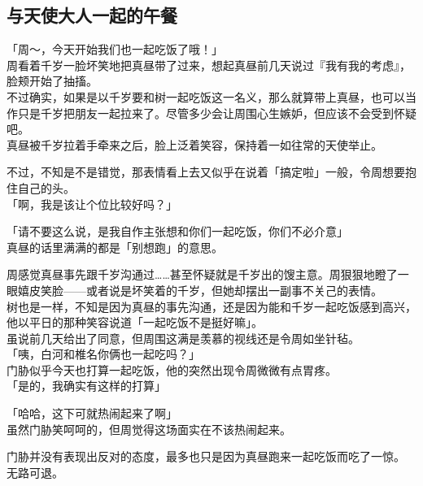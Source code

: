 \subsection{与天使大人一起的午餐}

「周～，今天开始我们也一起吃饭了哦！」\\

周看着千岁一脸坏笑地把真昼带了过来，想起真昼前几天说过『我有我的考虑』，脸颊开始了抽搐。\\

不过确实，如果是以千岁要和树一起吃饭这一名义，那么就算带上真昼，也可以当作只是千岁把朋友一起拉来了。尽管多少会让周围心生嫉妒，但应该不会受到怀疑吧。\\

真昼被千岁拉着手牵来之后，脸上泛着笑容，保持着一如往常的天使举止。

不过，不知是不是错觉，那表情看上去又似乎在说着「搞定啦」一般，令周想要抱住自己的头。\\

「啊，我是该让个位比较好吗？」

「请不要这么说，是我自作主张想和你们一起吃饭，你们不必介意」\\

真昼的话里满满的都是「别想跑」的意思。

周感觉真昼事先跟千岁沟通过……甚至怀疑就是千岁出的馊主意。周狠狠地瞪了一眼嬉皮笑脸——或者说是坏笑着的千岁，但她却摆出一副事不关己的表情。\\

树也是一样，不知是因为真昼的事先沟通，还是因为能和千岁一起吃饭感到高兴，他以平日的那种笑容说道「一起吃饭不是挺好嘛」。\\

虽说前几天给出了同意，但周围这满是羡慕的视线还是令周如坐针毡。\\

「咦，白河和椎名你俩也一起吃吗？」\\

门胁似乎今天也打算一起吃饭，他的突然出现令周微微有点胃疼。\\

「是的，我确实有这样的打算」

「哈哈，这下可就热闹起来了啊」\\

虽然门胁笑呵呵的，但周觉得这场面实在不该热闹起来。

门胁并没有表现出反对的态度，最多也只是因为真昼跑来一起吃饭而吃了一惊。\\

无路可退。\\

